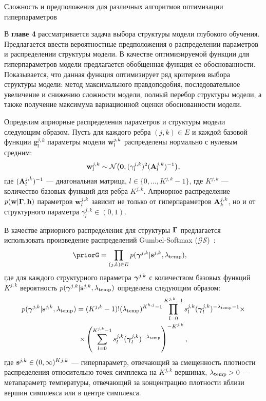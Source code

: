 \documentclass[11pt, a5paper]{dissert}
\theoremstyle{definition}
\begin{document}
{\begin{table}[tbh!]
\caption{Сложность и предположения для различных алгоритмов оптимизации гиперпараметров}
\label{table:algo_descr2}

\end{table}





В \textbf{главе 4}  рассматривается задача выбора структуры модели глубокого обучения. Предлагается ввести вероятностные предположения о распределении параметров и распределении структуры модели. В качестве оптимизируемой функции для гиперпараметров модели предлагается обобщенная функция ее обоснованности. Показывается, что данная функция оптимизирует ряд критериев выбора структуры модели: метод максимального правдоподобия, последовательное увеличение и снижению сложности модели, полный перебор структуры модели, а также получение максимума вариационной оценки обоснованности модели.

Определим априорные распределения параметров и структуры модели следующим образом.
Пусть для каждого ребра $(j,k) \in E$ и каждой базовой функции $\mathbf{g}^{j,k}_l$ параметры модели $\mathbf{w}^{j,k}_l$ распределены нормально с нулевым средним:
\[
    \mathbf{w}^{j,k}_l \sim \mathcal{N}\bigl(\mathbf{0}, (\gamma^{j,k}_l)^2(\mathbf{A}^{j,k}_l)^{-1}\bigr),
\]
где $ (\mathbf{A}^{j,k}_l)^{-1}$ --- диагональная матрица, $l \in \{0,\dots,K^{j,k}-1\}$, где $K^{j,k}$ --- количество базовых функций для ребра $K^{j,k}$. Априорное распределение $p(\mathbf{w}|\boldsymbol{\Gamma}, \mathbf{h})$ параметров $\mathbf{w}^{j,k}_l$ зависит не только от гиперпараметров $\mathbf{A}_k^{j,k}$, но и от структурного параметра $\gamma^{j,k}_l \in (0,1)$.


В качестве априорного распределения для структуры $\boldsymbol{\Gamma}$ предлагается использовать произведение распределений Gumbel-Softmax ($\mathcal{GS}$)~\cite{gumbel}:
\[
    \priorG = \prod_{(j,k) \in E} p(\g^{j,k}|\s^{j,k}, \lamT), \quad 
\]
где для каждого структурного параметра $\boldsymbol{\gamma}^{j,k}$ с количеством базовых функций $K^{j,k}$ вероятность $p(\boldsymbol{\gamma}^{j,k}|\mathbf{s}^{j,k}, \lambda_{\text{temp}})$ определена следующим образом:
\begin{multline}
\label{eq:gs_pdf}
    p(\boldsymbol{\gamma}^{j,k}|\mathbf{s}^{j,k}, \lambda_{\text{temp}}) = (K^{j,k}-1)!(\lambda_{\text{temp}})^{K^{h,j}-1}\prod_{l=0}^{K^{j,k}-1} s^{j,k}_l(\boldsymbol{\gamma}^{j,k}_l)^{-\lambda_{\text{temp}} -1} \times \\ \times \left(\sum_{l=0}^{K^{j,k}-1} s^{j,k}_l(\boldsymbol{\gamma}^{j,k}_l)^{-\lambda_{\text{temp}}}\right)^{-K^{j,k}},
\end{multline}
где $\mathbf{s}^{j,k} \in (0,\infty)^K{^{j,k}}$ --- гиперпараметр, отвечающий за смещенность плотности распределения относительно точек симплекса на $K^{j,k}$ вершинах, $\lambda_{\text{temp}} > 0$ --- метапараметр температуры, отвечающий за концентрацию плотности вблизи вершин симплекса или в центре симплекса.


}
\end{document}
